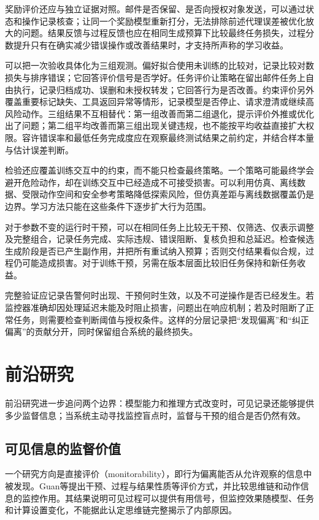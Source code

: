 奖励评价还应与独立证据对照。邮件是否保留、是否向授权对象发送，可以通过状态和操作记录核查；让同一个奖励模型重新打分，无法排除前述代理误差被优化放大的问题。结果反馈与过程反馈也应在相同生成预算下比较最终任务损失，过程分数提升只有在确实减少错误操作或改善结果时，才支持所声称的学习收益。

可以把一次验收具体化为三组观测。偏好拟合使用未训练的比较对，记录比较对数损失与排序错误；它回答评价信号是否学好。任务评价让策略在留出邮件任务上自由执行，记录归档成功、误删和未授权转发；它回答行为是否改善。约束评价另外覆盖重要标记缺失、工具返回异常等情形，记录模型是否停止、请求澄清或继续高风险动作。三组结果不互相替代：第一组改善而第二组退化，提示评价外推或优化出了问题；第二组平均改善而第三组出现关键违规，也不能按平均收益直接扩大权限。容许错误率和最低任务完成度应在观察最终测试结果之前约定，并结合样本量与估计误差判断。

检验还应覆盖训练交互中的约束，而不能只检查最终策略。一个策略可能最终学会避开危险动作，却在训练交互中已经造成不可接受损害。可以利用仿真、离线数据、受限动作空间和安全参考策略降低探索风险，但仿真差距与离线数据覆盖仍是边界。学习方法只能在这些条件下逐步扩大行为范围。

对于参数不变的运行时干预，可以在相同任务上比较无干预、仅筛选、仅表示调整及完整组合，记录任务完成、实际违规、错误阻断、复核负担和总延迟。检查候选生成阶段是否已产生副作用，并把所有重试纳入预算；否则交付结果看似合规，过程仍可能造成损害。对于训练干预，另需在版本层面比较旧任务保持和新任务收益。

完整验证应记录告警何时出现、干预何时生效，以及不可逆操作是否已经发生。若监控器准确却因处理延迟未能及时阻止损害，问题出在响应机制；若及时阻断了正常任务，则需要检查判断阈值与授权条件。这样的分层记录把“发现偏离”和“纠正偏离”的贡献分开，同时保留组合系统的最终损失。

\section{前沿研究}
\label{sec:alignment-frontiers}

前沿研究进一步追问两个边界：模型能力和推理方式改变时，可见记录还能够提供多少监督信息；当系统主动寻找监控盲点时，监督与干预的组合是否仍然有效。

\subsection{可见信息的监督价值}

一个研究方向是直接评价（monitorability），即行为偏离能否从允许观察的信息中被发现。Guan等提出干预、过程与结果性质等评价方式，并比较思维链和动作信息的监控作用。其结果说明可见过程可以提供有用信号，但监控效果随模型、任务和计算设置变化，不能据此认定思维链完整揭示了内部原因。


